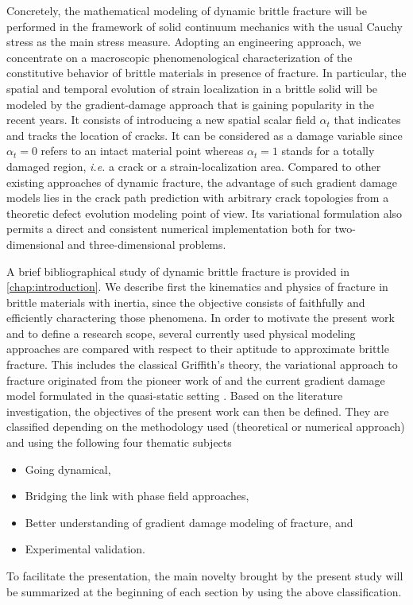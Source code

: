 Concretely, the mathematical modeling of dynamic brittle fracture will be performed in the framework of solid continuum mechanics with the usual Cauchy stress as the main stress measure. Adopting an engineering approach, we concentrate on a macroscopic phenomenological characterization of the constitutive behavior of brittle materials in presence of fracture. In particular, the spatial and temporal evolution of strain localization in a brittle solid will be modeled by the gradient-damage approach that is gaining popularity in the recent years. It consists of introducing a new spatial scalar field $\alpha_t$ that indicates and tracks the location of cracks. It can be considered as a damage variable since $\alpha_t=0$ refers to an intact material point whereas $\alpha_t=1$ stands for a totally damaged region, \emph{i.e.} a crack or a strain-localization area. Compared to other existing approaches of dynamic fracture, the advantage of such gradient damage models lies in the crack path prediction with arbitrary crack topologies from a theoretic defect evolution modeling point of view. Its variational formulation also permits a direct and consistent numerical implementation both for two-dimensional and three-dimensional problems.

A brief bibliographical study of dynamic brittle fracture is provided in \cref{chap:introduction}. We describe first the kinematics and physics of fracture in brittle materials with inertia, since the objective consists of faithfully and efficiently charactering those phenomena. In order to motivate the present work and to define a research scope, several currently used physical modeling approaches are compared with respect to their aptitude to approximate brittle fracture. This includes the classical Griffith's theory, the variational approach to fracture originated from the pioneer work of \cite{FrancfortMarigo:1998} and the current gradient damage model formulated in the quasi-static setting \cite{PhamMarigo:2010-1}. Based on the literature investigation, the objectives of the present work can then be defined. They are classified depending on the methodology used (theoretical or numerical approach) and using the following four thematic subjects
\begin{itemize}
\item Going dynamical,
\item Bridging the link with phase field approaches,
\item Better understanding of gradient damage modeling of fracture, and
\item Experimental validation.
\end{itemize}
To facilitate the presentation, the main novelty brought by the present study will be summarized at the beginning of each section by using the above classification.

